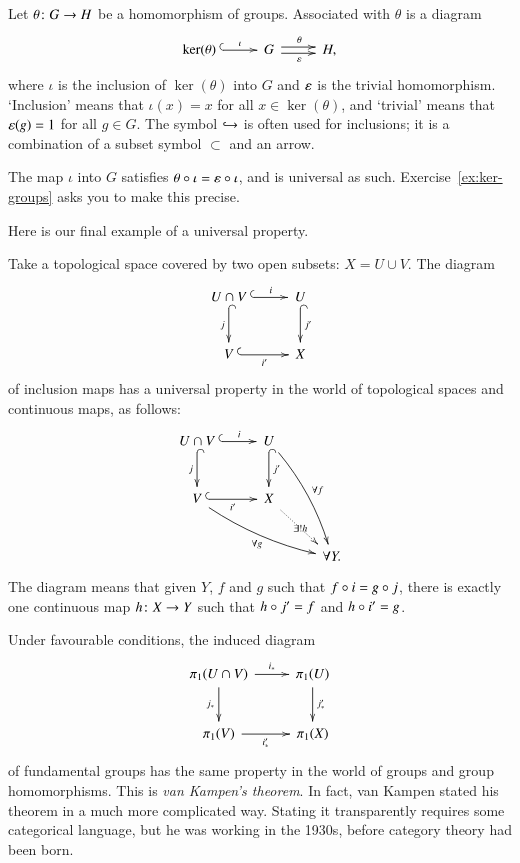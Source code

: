 \begin{iexample}
\label{eg:univ-kernel}
Let $\theta\from G \to H$ be a homomorphism of groups.%
%
%
Associated with $\theta$ is a diagram
%
\begin{equation}
\label{eq:eq-groups}
%
\index{kernel}
%
\begin{array}{c}
\xymatrix@M+.5ex{
\ker(\theta) \ar@{^{(}->}[r]^-{\iota} &
G \ar@<.5ex>[r]^\theta \ar@<-.5ex>[r]_\epsln      &
H,
}
\end{array}
\end{equation}
%
where $\iota$ is the inclusion of $\ker(\theta)$ into $G$ and $\varepsilon$ is
the trivial homomorphism.  `Inclusion'%
%
%
means that $\iota(x) = x$ for all $x \in \ker(\theta)$, and `trivial' means
that $\varepsilon(g) = 1$ for all $g \in G$.  The symbol $\hookrightarrow$%
%
%
is often used for inclusions; it is a combination of a subset symbol
$\subset$ and an arrow.

The map $\iota$ into $G$ satisfies $\theta \mathbin{\circ} \iota = \varepsilon \mathbin{\circ} \iota$,
and is universal as such.  Exercise~\ref{ex:ker-groups} asks you to make
this precise.
\end{iexample}

Here is our final example of a universal property.

\begin{iexample}
\label{eg:univ-van-Kampen}
Take a topological%
%
%
space covered by two open subsets: $X = U \cup V$.  The diagram
\[
\xymatrix@M+0.5ex{
U \cap V \ar@{^{(}->}[r]^-{i} \ar@{^{(}->}[d]_-{j}      &
U \ar@{^{(}->}[d]^-{j'} \\
V \ar@{^{(}->}[r]_-{i'} &
X
}
\]
of inclusion maps has a universal property in the world of topological spaces
and continuous maps, as follows:
%
\begin{equation}
\label{eq:pushout-vK}
\begin{array}{c}
\xymatrix@M+.5ex{
U \cap V \ar@{^{(}->}[r]^-{i} \ar@{^{(}->}[d]_-{j}      &
U \ar@{^{(}->}[d]^-{j'} \ar@/^/[ddr]^{\forall f} &
\\
V \ar@{^{(}->}[r]_-{i'} \ar@/_/[drr]_{\forall g} &
X \ar@{.>}[dr]|{\exists! h}     &
\\
&
&
\forall Y.
}
\end{array}
\end{equation}
%
The diagram means that given $Y$, $f$ and $g$ such that $f \mathbin{\circ} i = g \mathbin{\circ}
j$, there is exactly one continuous map $h\from X \to Y$ such that $h \mathbin{\circ}
j' = f$ and $h \mathbin{\circ} i' = g$.

Under favourable conditions, the induced diagram
\[
\xymatrix@M+0.5ex{
\pi_1(U \cap V) \ar[r]^-{i_*} \ar[d]_-{j_*}      &
\pi_1(U) \ar[d]^-{j'_*} \\
\pi_1(V) \ar[r]_-{i'_*} &
\pi_1(X)
}
\]
of fundamental%
%
%
groups has the same property in the world of groups and group
homomorphisms.  This is \emph{van%
%
%
Kampen's theorem}.  In fact, van Kampen stated his theorem in a much more
complicated way.  Stating it transparently requires some categorical
language, but he was working in the 1930s, before category theory had been
born.
\end{iexample}

